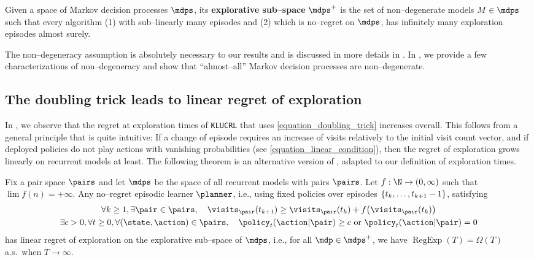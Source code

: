 \documentclass[preprint,cleveref,12pt]{colt2025}
\DeclarePairedDelimiter{\braces}{\{}{\}}	%
\DeclarePairedDelimiter{\parens}{(}{)}	%
\def\model{\mdp}
\def\models{\mdps}
\DeclareMathOperator{\RegExp}{\mathrm{RegExp}}
\newcommand{\strong}[1]{\textbf{#1}}
\begin{document}
    \begin{definition}
    \label{definition_explorative}
        Given a space of Markov decision processes $\models$, its \strong{explorative sub--space} $\models^+$ is the set of non--degenerate models $M \in \models$ such that every algorithm {\upshape (1)} with sub--linearly many episodes and {\upshape (2)} which is no--regret on $\models$, has infinitely many exploration episodes almost surely.
    \end{definition}

    The non--degeneracy assumption 
    is absolutely necessary to our results and is discussed in more details in .
    In , we provide a few characterizations of non--degeneracy and show that ``almost--all'' Markov decision processes are non--degenerate.

    \subsection{The doubling trick leads to linear regret of exploration}
    \label{section_regexp}

    In , we observe that the regret at exploration times of \texttt{KLUCRL} that uses \eqref{equation_doubling_trick} increases overall.
    This follows from a general principle that is quite intuitive:
    If a change of episode requires an increase of visits relatively to the initial visit count vector, and if deployed policies do not play actions with vanishing probabilities (see \eqref{equation_linear_condition}), then the regret of exploration grows linearly on recurrent models at least. 
    The following theorem is an alternative version of \cite[Theorem~1]{boone_regret_2023}, adapted to our definition of exploration times.

    \begin{theorem}
    \label{theorem_linear_regexp}
        Fix a pair space $\pairs$ and let $\models$ be the space of all recurrent models with pairs $\pairs$. 
        Let $f : \N \to (0, \infty)$ such that $\lim f(n) = + \infty$. 
        Any no--regret episodic learner $\planner$, i.e., using fixed policies over episodes $\braces{t_k, \ldots, t_{k+1}-1}$, satisfying
        \begin{equation}
        \label{equation_linear_condition}
        \begin{gathered}
            \forall k \ge 1,
            \exists \pair \in \pairs,
            \quad
            \visits_\pair({t_{k+1}}) \ge \visits_\pair({t_k}) + f\parens*{\visits_\pair({t_k})}
            \\
            \exists c > 0,
            \forall t \ge 0, \forall (\state, \action) \in \pairs,
            \quad
            \policy_t(\action|\pair) \ge c \text{~or~} \policy_t(\action|\pair) = 0
        \end{gathered}
        \end{equation}
        has linear regret of exploration on the explorative sub--space of $\models$, i.e., for all $\model \in \models^+$, we have $\RegExp(T) = \Omega(T)$ a.s.~when $T \to \infty$.
    \end{theorem}
\end{document}
